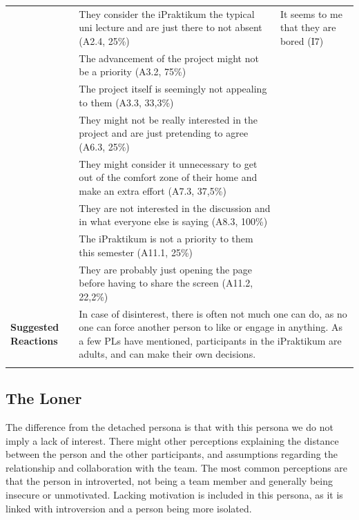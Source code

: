 \begin{longtable}[ht]{ p{}  p{} p{} }
     & They consider the iPraktikum the typical uni lecture and are just there to not absent (A2.4, 25\%) & It seems to me that they are bored (I7) \\
     & The advancement of the project might not be a priority (A3.2, 75\%) \\
     & The project itself is seemingly not appealing to them (A3.3, 33,3\%) \\
 	 & They might not be really interested in the project and are just pretending to agree (A6.3, 25\%)  \\
 	 & They might consider it unnecessary to get out of the comfort zone of their home and make an extra effort (A7.3, 37,5\%) \\
 	 & They are not interested in the discussion and in what everyone else is saying (A8.3, 100\%) \\
 	 & The iPraktikum is not a priority to them this semester (A11.1, 25\%) \\
 	 & They are probably just opening the page before having to share the screen (A11.2,  22,2\%) \\
    \hline   
     \textbf{Suggested Reactions} & \multicolumn{2}{p{.80\textwidth}}{In case of disinterest, there is often not much one can do, as no one can force another person to like or engage in anything. As a few PLs have mentioned, participants in the iPraktikum are adults, and can make their own decisions.} \\
    \hline
\label{tab:multicol}
\end{longtable}

\subsection{The Loner}

The difference from the detached persona is that with this persona we do not imply a lack of interest. There might other perceptions explaining the distance between the person and the other participants, and assumptions regarding the relationship and collaboration with the team. The most common perceptions are that the person in introverted, not being a team member and generally being insecure or unmotivated. Lacking motivation is included in this persona, as it is linked with introversion and a person being more isolated. 

